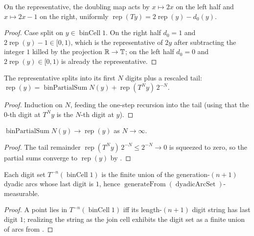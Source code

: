 \begin{lemma}\label{rep_doublingMap}
  \leanok
  On the representative, the doubling map acts by \(x\mapsto 2x\) on the left half and
  \(x\mapsto 2x-1\) on the right, uniformly
  \(\operatorname{rep}(Ty)=2\operatorname{rep}(y)-d_0(y)\).
\end{lemma}
\begin{proof}\leanok
  Case split on \(y\in\operatorname{binCell}1\). On the right half \(d_0=1\) and
  \(2\operatorname{rep}(y)-1\in[0,1)\), which is the representative of \(2y\) after subtracting the
  integer \(1\) killed by the projection \(\mathbb{R}\to\mathbb T\); on the left half \(d_0=0\) and
  \(2\operatorname{rep}(y)\in[0,1)\) is already the representative.
\end{proof}

\begin{lemma}\label{rep_eq_binPartialSum_add}
  \leanok
  The representative splits into its first \(N\) digits plus a rescaled tail:
  \(\operatorname{rep}(y)=\operatorname{binPartialSum}N(y)+\operatorname{rep}(T^N y)\,2^{-N}\).
\end{lemma}
\begin{proof}\leanok
  Induction on \(N\), feeding the one-step recursion  into the tail
  (using that the \(0\)-th digit at \(T^N y\) is the \(N\)-th digit at \(y\)).
\end{proof}

\begin{lemma}\label{tendsto_binPartialSum}
  \leanok
  \(\operatorname{binPartialSum}N(y)\to\operatorname{rep}(y)\) as \(N\to\infty\).
\end{lemma}
\begin{proof}\leanok
  The tail remainder \(\operatorname{rep}(T^N y)\,2^{-N}\le 2^{-N}\to 0\) is squeezed to zero, so
  the partial sums converge to \(\operatorname{rep}(y)\) by .
\end{proof}

\begin{lemma}\label{preimage_iterate_binCell_one_mem}
  \leanok
  Each digit set \(T^{-n}(\operatorname{binCell}1)\) is the finite union of the generation-\((n+1)\)
  dyadic arcs whose last digit is \(1\), hence \(\operatorname{generateFrom}(\operatorname{dyadicArcSet})\)-measurable.
\end{lemma}
\begin{proof}\leanok
  A point lies in \(T^{-n}(\operatorname{binCell}1)\) iff its length-\((n+1)\) digit string has last
  digit \(1\); realizing the string as the join cell exhibits the digit set as a finite union of
  arcs from .
\end{proof}

